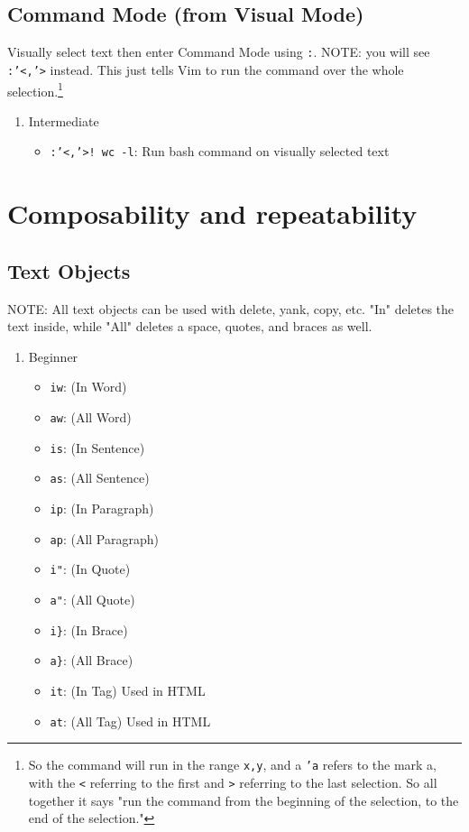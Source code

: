 \documentclass[11pt]{article}
\begin{document}
\subsection{Command Mode (from Visual Mode)}
\label{sec:org615707b}
Visually select text then enter Command Mode using \texttt{:}. NOTE: you will see
\texttt{:'<,'>} instead. This just tells Vim to run the command over the whole
selection.\footnote{So the command will run in the range \texttt{x,y}, and 
a \texttt{'a} refers to the mark a, with the \texttt{<} referring to the first and \texttt{>}
referring to the last selection. So all together it says "run the command from
the beginning of the selection, to the end of the selection."}
\begin{enumerate}
\item Intermediate
\label{sec:orge0d6e9b}
\begin{itemize}
\item \texttt{:'<,'>! wc -l}: Run bash command on visually selected text
\end{itemize}
\end{enumerate}
\section{Composability and repeatability}
\label{sec:org6c126db}
\subsection{Text Objects}
\label{sec:org9507d43}
NOTE: All text objects can be used with delete, yank, copy, etc. "In" deletes
the text inside, while "All" deletes a space, quotes, and braces as well.
\begin{enumerate}
\item Beginner
\label{sec:org90afc2a}
\begin{itemize}
\item \texttt{iw}: (In Word)
\item \texttt{aw}: (All Word)
\item \texttt{is}: (In Sentence)
\item \texttt{as}: (All Sentence)
\item \texttt{ip}: (In Paragraph)
\item \texttt{ap}: (All Paragraph)
\item \texttt{i"}: (In Quote)
\item \texttt{a"}: (All Quote)
\item \texttt{i\}}: (In Brace)
\item \texttt{a\}}: (All Brace)
\item \texttt{it}: (In Tag) Used in HTML
\item \texttt{at}: (All Tag) Used in HTML
\end{itemize}
\end{enumerate}
\end{document}

